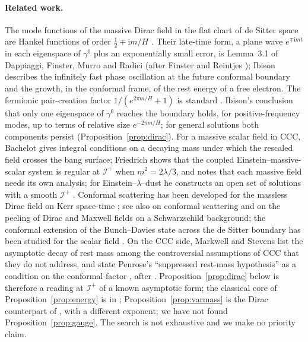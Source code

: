 \documentclass[11pt,a4paper]{article}
\theoremstyle{definition}
\newcommand{\scri}{\mathscr{I}^{+}}
\newcommand{\ii}{\mathrm{i}}
\begin{document}
\paragraph{Related work.} The mode functions of the massive Dirac field in the flat chart of de Sitter space are Hankel functions of order $\tfrac12\mp\ii m/H$ \cite{Cotaescu2002}. Their late-time form, a plane wave $e^{\mp\ii mt}$ in each eigenspace of $\gamma^{0}$ plus an exponentially small error, is Lemma~3.1 of Dappiaggi, Finster, Murro and Radici \cite{DFMR2019} (after Finster and Reintjes \cite{FinsterReintjes2016}); Ibison \cite{Ibison2011} describes the infinitely fast phase oscillation at the future conformal boundary and the growth, in the conformal frame, of the rest energy of a free electron. The fermionic pair-creation factor $1/(e^{2\pi m/H}+1)$ is standard \cite{Boonpan2026}. Ibison's conclusion that only one eigenspace of $\gamma^{0}$ reaches the boundary holds, for positive-frequency modes, up to terms of relative size $e^{-2\pi m/H}$; for general solutions both components persist (Proposition~\ref{prop:dirac}). For a massive scalar field in CCC, Bachelot \cite{Bachelot2020} gives integral conditions on a decaying mass under which the rescaled field crosses the bang surface; Friedrich \cite{Friedrich2015} shows that the coupled Einstein--massive-scalar system is regular at $\scri$ when $m^{2}=2\lambda/3$, and notes that each massive field needs its own analysis; for Einstein--$\lambda$--dust he constructs an open set of solutions with a smooth $\scri$ \cite{Friedrich2017}. Conformal scattering has been developed for the massless Dirac field on Kerr space-time \cite{Pham2021}; see also \cite{MasonNicolas2004} on conformal scattering and \cite{MasonNicolas2012} on the peeling of Dirac and Maxwell fields on a Schwarzschild background; the conformal extension of the Bunch--Davies state across the de Sitter boundary has been studied for the scalar field \cite{Wrochna2017}. On the CCC side, Markwell and Stevens list the asymptotic decay of rest mass among the controversial assumptions of CCC that they do not address, and state Penrose's ``suppressed rest-mass hypothesis'' as a condition on the conformal factor \cite{MarkwellStevens2022}, after \cite{GurzadyanPenrose2013}. Proposition~\ref{prop:dirac} below is therefore a reading at $\scri$ of a known asymptotic form; the classical core of Proposition~\ref{prop:energy} is in \cite{Ibison2011}; Proposition~\ref{prop:varmass} is the Dirac counterpart of \cite{Bachelot2020}, with a different exponent; we have not found Proposition~\ref{prop:gauge}. The search is not exhaustive and we make no priority claim.
\end{document}
